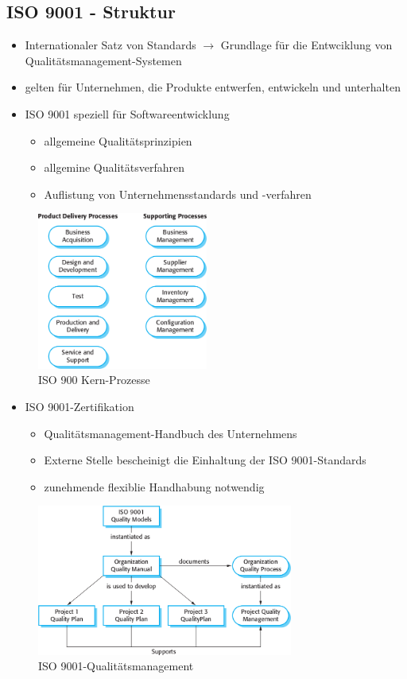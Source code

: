 \subsection{ISO 9001 - Struktur}
\begin{itemize}
    \item Internationaler Satz von Standards $\rightarrow$ Grundlage für die Entwciklung von Qualitätsmanagement-Systemen
    \item gelten für Unternehmen, die Produkte entwerfen, entwickeln und unterhalten
    \item ISO 9001 speziell für Softwareentwicklung
    \begin{itemize}
        \item allgemeine Qualitätsprinzipien
        \item allgemine Qualitätsverfahren
        \item Auflistung von Unternehmensstandards und -verfahren
    \end{itemize}
\end{itemize}
\begin{figure}[h]
    \centering
    \includegraphics[width=0.5\textwidth]{mainmatter/pics/iso.png}
    \caption{ISO 900 Kern-Prozesse}
\end{figure}
\begin{itemize}
    \item ISO 9001-Zertifikation
    \begin{itemize}
        \item Qualitätsmanagement-Handbuch des Unternehmens 
        \item Externe Stelle bescheinigt die Einhaltung der ISO 9001-Standards
        \item zunehmende flexiblie Handhabung notwendig
    \end{itemize}
\end{itemize}
\begin{figure}[h]
    \centering
    \includegraphics[width=0.75\textwidth]{mainmatter/pics/iso_9001.png}
    \caption{ISO 9001-Qualitätsmanagement}
\end{figure}


